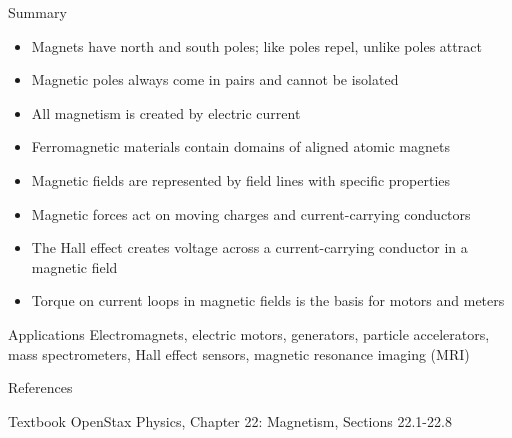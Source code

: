 \documentclass{beamer}
\begin{document}
\begin{frame}{Summary}
\begin{itemize}
\item Magnets have north and south poles; like poles repel, unlike poles attract
\item Magnetic poles always come in pairs and cannot be isolated
\item All magnetism is created by electric current
\item Ferromagnetic materials contain domains of aligned atomic magnets
\item Magnetic fields are represented by field lines with specific properties
\item Magnetic forces act on moving charges and current-carrying conductors
\item The Hall effect creates voltage across a current-carrying conductor in a magnetic field
\item Torque on current loops in magnetic fields is the basis for motors and meters
\end{itemize}

\begin{block}{Applications}
Electromagnets, electric motors, generators, particle accelerators, mass spectrometers, Hall effect sensors, magnetic resonance imaging (MRI)
\end{block}
\end{frame}

\begin{frame}{References}
\begin{block}{Textbook}
OpenStax Physics, Chapter 22: Magnetism, Sections 22.1-22.8
\end{block}
\end{frame}
\end{document}
